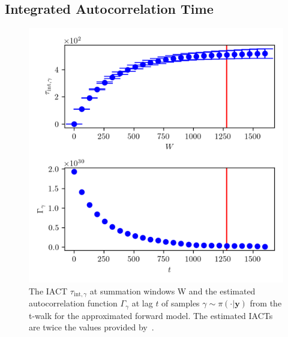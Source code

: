 \subsection{Integrated Autocorrelation Time} 
\begin{figure}[ht!]
	\centering
	\includegraphics{UwerrTauIntTWalk0.png}
	\caption[IACT and autocorrelation function of samples $\gamma \sim \pi(\cdot|\bm{y})$, for approximated model.]{The IACT $\tau_{\text{int},\gamma }$ at summation windows W and the estimated autocorrelation function $\Gamma_{\gamma }$ at lag $t$ of samples $\gamma  \sim \pi( \cdot| \bm{y})$ from the t-walk for the approximated forward model.
	The estimated IACTs are twice the values provided by~\cite{drikHesse, UwerrM}.}
	\label{fig:TWalkIATC1}
\end{figure}
